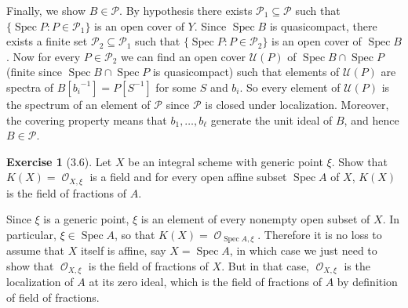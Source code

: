 \documentclass[10pt]{article}
\newcommand{\Spec}{\operatorname{Spec}}
\DeclareMathOperator{\Olo}{\mathscr O}
\theoremstyle{definition}
\newtheorem{exer}{Exercise}
\begin{document}
Finally, we show $B \in \mathcal P$.
By hypothesis there exists $\mathcal P_1 \subseteq \mathcal P$ such that $\{\Spec P: P \in \mathcal P_1\}$ is an open cover of $Y$.
Since $\Spec B$ is quasicompact, there exists a finite set $\mathcal P_2 \subseteq \mathcal P_1$ such that $\{\Spec P: P \in \mathcal P_2\}$ is an open cover of $\Spec B$.
Now for every $P \in \mathcal P_2$ we can find an open cover $\mathcal U(P)$ of $\Spec B \cap \Spec P$ (finite since $\Spec B \cap \Spec P$ is quasicompact) such that elements of $\mathcal U(P)$ are spectra of $B[{b_i}^{-1}] = P[S^{-1}]$ for some $S$ and $b_i$.
So every element of $\mathcal U(P)$ is the spectrum of an element of $\mathcal P$ since $\mathcal P$ is closed under localization.
Moreover, the covering property means that $b_1, \dots, b_\ell$ generate the unit ideal of $B$, and hence $B \in \mathcal P$.

\begin{exer}[3.6]
Let $X$ be an integral scheme with generic point $\xi$.
Show that $K(X) = \Olo_{X, \xi}$ is a field and for every open affine subset $\Spec A$ of $X$, $K(X)$ is the field of fractions of $A$.
\end{exer}

Since $\xi$ is a generic point, $\xi$ is an element of every nonempty open subset of $X$.
In particular, $\xi \in \Spec A$, so that $K(X) = \Olo_{\Spec A, \xi}$.
Therefore it is no loss to assume that $X$ itself is affine, say $X = \Spec A$, in which case we just need to show that $\Olo_{X, \xi}$ is the field of fractions of $X$.
But in that case, $\Olo_{X, \xi}$ is the localization of $A$ at its zero ideal, which is the field of fractions of $A$ by definition of field of fractions.
\end{document}
